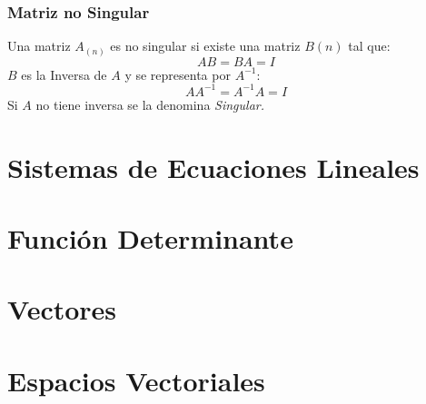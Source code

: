 \subsection{Matriz no Singular}
Una matriz $A_{(n)}$ es no singular si existe una matriz $B(n)$ tal que:
$$AB=BA=I$$
$B$ es la Inversa de $A$ y se representa por $A^{-1}$:
$$AA^{-1}=A^{-1}A=I$$
Si $A$ no tiene inversa se la denomina \textit{Singular.}
\chapter{Sistemas de Ecuaciones Lineales}
\chapter{Función Determinante}
\chapter{Vectores}
\chapter{Espacios Vectoriales}